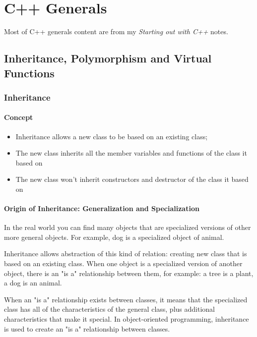 \documentclass[12pt]{book}
\date{\today}
\title{}
\begin{document}
\tableofcontents


\part{C++ Generals}
\label{sec:org9236a30}
Most of C++ generals content are from my \emph{Starting out with C++} notes. 
\chapter{Inheritance, Polymorphism and Virtual Functions}
\label{sec:orgb5ce505}
\section{Inheritance}
\label{sec:org2d692ea}
\subsection{Concept}
\label{sec:org37616e5}
\begin{itemize}
\item Inheritance allows a new class to be based on an existing class;
\item The new class inherits all the member variables and functions of the class it based on
\item The new class won't inherit constructors and destructor of the class it based on
\end{itemize}

\subsection{Origin of Inheritance: Generalization and Specialization}
\label{sec:org94186fc}
In the real world you can find many objects that are specialized versions of other more general objects. For example, dog is a specialized object of animal.

Inheritance allows abstraction of this kind of relation: creating new class that is based on an existing class. When one object is a specialized version of another object, there is an "is a" relationship between them, for example: a tree is a plant, a dog is an animal.

When an "is a" relationship exists between classes, it means that the specialized class has all of the characteristics of the general class, plus additional characteristics that make it special. In object-oriented programming, inheritance is used to create an "is a" relationship between classes. 
\end{document}

